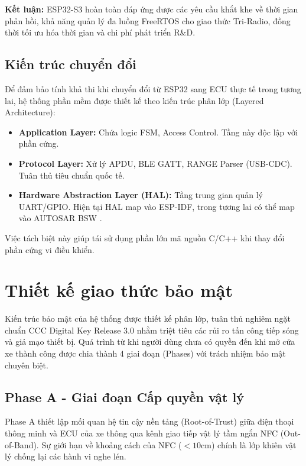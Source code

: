 \textbf{Kết luận:} ESP32-S3 hoàn toàn đáp ứng được các yêu cầu khắt khe về thời gian phản hồi, khả năng quản lý đa luồng FreeRTOS cho giao thức Tri-Radio, đồng thời tối ưu hóa thời gian và chi phí phát triển R\&D.

\subsection{Kiến trúc chuyển đổi}
Để đảm bảo tính khả thi khi chuyển đổi từ ESP32 sang ECU thực tế trong tương lai, hệ thống phần mềm được thiết kế theo kiến trúc phân lớp (Layered Architecture):

\begin{itemize}
    \item \textbf{Application Layer:} Chứa logic FSM, Access Control. Tầng này độc lập với phần cứng.
    \item \textbf{Protocol Layer:} Xử lý APDU, BLE GATT, RANGE Parser (USB-CDC). Tuân thủ tiêu chuẩn quốc tế.
    \item \textbf{Hardware Abstraction Layer (HAL):} Tầng trung gian quản lý UART/GPIO. Hiện tại HAL map vào ESP-IDF, trong tương lai có thể map vào AUTOSAR BSW \cite{iso26262}.
\end{itemize}

Việc tách biệt này giúp tái sử dụng phần lớn mã nguồn C/C++ khi thay đổi phần cứng vi điều khiển.










\section{Thiết kế giao thức bảo mật}

Kiến trúc bảo mật của hệ thống được thiết kế phân lớp, tuân thủ nghiêm ngặt chuẩn CCC Digital Key Release 3.0 nhằm triệt tiêu các rủi ro tấn công tiếp sóng và giả mạo thiết bị. Quá trình từ khi người dùng chưa có quyền đến khi mở cửa xe thành công được chia thành 4 giai đoạn (Phases) với trách nhiệm bảo mật chuyên biệt.

\subsection{Phase A - Giai đoạn Cấp quyền vật lý}
Phase A thiết lập mối quan hệ tin cậy nền tảng (Root-of-Trust) giữa điện thoại thông minh và ECU của xe thông qua kênh giao tiếp vật lý tầm ngắn NFC (Out-of-Band). Sự giới hạn về khoảng cách của NFC ($< 10$cm) chính là lớp khiên vật lý chống lại các hành vi nghe lén.

